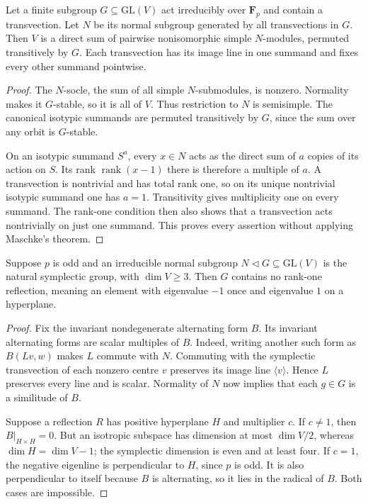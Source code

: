 \begin{lemma}\label{lem:normal-transvection-blocks}
Let a finite subgroup $G\subseteq\mathrm{GL}(V)$ act irreducibly over $\mathbf F_p$ and contain a transvection. Let $N$ be its normal subgroup generated by all transvections in $G$. Then $V$ is a direct sum of pairwise nonisomorphic simple $N$-modules, permuted transitively by $G$. Each transvection has its image line in one summand and fixes every other summand pointwise.
\end{lemma}
\begin{proof}
The $N$-socle, the sum of all simple $N$-submodules, is nonzero. Normality makes it $G$-stable, so it is all of $V$. Thus restriction to $N$ is semisimple. The canonical isotypic summands are permuted transitively by $G$, since the sum over any orbit is $G$-stable.

On an isotypic summand $S^a$, every $x\in N$ acts as the direct sum of $a$ copies of its action on $S$. Its rank $\operatorname{rank}(x-1)$ there is therefore a multiple of $a$. A transvection is nontrivial and has total rank one, so on its unique nontrivial isotypic summand one has $a=1$. Transitivity gives multiplicity one on every summand. The rank-one condition then also shows that a transvection acts nontrivially on just one summand. This proves every assertion without applying Maschke's theorem.
\end{proof}

\begin{lemma}\label{lem:symplectic-reflection-obstruction}
Suppose $p$ is odd and an irreducible normal subgroup $N\triangleleft G\subseteq\mathrm{GL}(V)$ is the natural symplectic group, with $\dim V\ge3$. Then $G$ contains no rank-one reflection, meaning an element with eigenvalue $-1$ once and eigenvalue $1$ on a hyperplane.
\end{lemma}
\begin{proof}
Fix the invariant nondegenerate alternating form $B$. Its invariant alternating forms are scalar multiples of $B$. Indeed, writing another such form as $B(Lv,w)$ makes $L$ commute with $N$. Commuting with the symplectic transvection of each nonzero centre $v$ preserves its image line $\langle v\rangle$. Hence $L$ preserves every line and is scalar. Normality of $N$ now implies that each $g\in G$ is a similitude of $B$.

Suppose a reflection $R$ has positive hyperplane $H$ and multiplier $c$. If $c\ne1$, then $B|_{H\times H}=0$. But an isotropic subspace has dimension at most $\dim V/2$, whereas $\dim H=\dim V-1$; the symplectic dimension is even and at least four. If $c=1$, the negative eigenline is perpendicular to $H$, since $p$ is odd. It is also perpendicular to itself because $B$ is alternating, so it lies in the radical of $B$. Both cases are impossible.
\end{proof}

